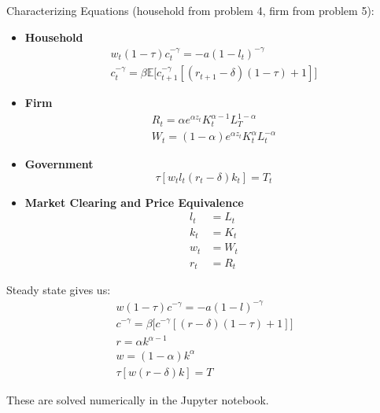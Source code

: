 \documentclass[12pt]{article}
\newenvironment{problem}[2][Problem]{\begin{trivlist}
\item[\hskip \labelsep {\bfseries #1}\hskip \labelsep {\bfseries #2.}]}{\end{trivlist}}
\theoremstyle{definition}
\theoremstyle{definition}
\theoremstyle{definition}
\theoremstyle{definition}
\begin{document}
\begin{problem}{6} Characterizing Equations (household from problem 4, firm from problem 5):
\begin{itemize}
\item \textbf{Household}
\begin{align}
w_t(1-\tau)c_t^{-\gamma} = -a(1-l_t)^{-\gamma} \\
c_t^{-\gamma} = \beta \mathbb{E} \big[ c_{t+1}^{-\gamma}[(r_{t+1}-\delta)(1-\tau) +1] \big]
\end{align}

\item \textbf{Firm}
\begin{align}
R_t = \alpha e^{\alpha z_t} K_t^{\alpha - 1} L_T^{1-\alpha} \\
W_t = (1 - \alpha) e^{\alpha z_t} K_t^\alpha L_t^{- \alpha}
\end{align}
\item \textbf{Government}
\begin{equation}
\tau[w_tl_t(r_t - \delta)k_t] = T_t
\end{equation}
\item \textbf{Market Clearing and Price Equivalence}
\begin{align}
l_t &= L_t \\
k_t &= K_t \\
w_t &= W_t \\
r_t &= R_t 
\end{align}
\end{itemize}
Steady state gives us:
\begin{align}
w(1 - \tau)c^{-\gamma} = - a (1 - l)^{-\gamma} \\
c^{-\gamma} = \beta \big[c^{-\gamma} [(r - \delta)(1 - \tau) + 1]\big] \\
r = \alpha k^{\alpha - 1} \\
w = (1 - \alpha)  k^\alpha \\
\tau[w(r - \delta)k] = T
\end{align}
\end{problem}
These are solved numerically in the Jupyter notebook.
\end{document}
